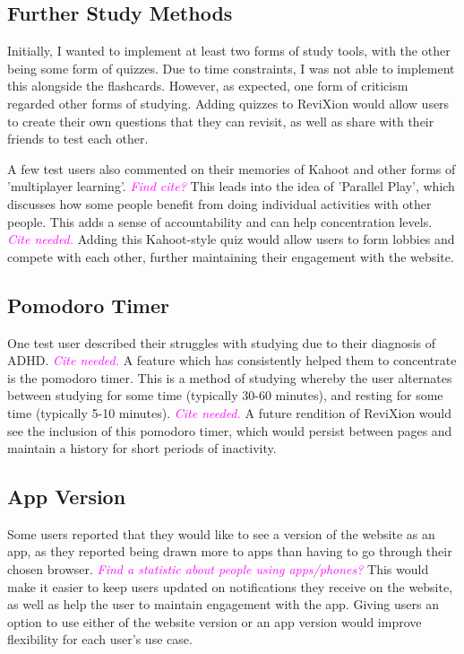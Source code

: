 \documentclass{report}
\begin{document}
\subsection{Further Study Methods}

Initially, I wanted to implement at least two forms of study tools, with the other being some form of quizzes.
Due to time constraints, I was not able to implement this alongside the flashcards.
However, as expected, one form of criticism regarded other forms of studying.
Adding quizzes to ReviXion would allow users to create their own questions that they can revisit,
as well as share with their friends to test each other.

A few test users also commented on their memories of Kahoot
and other forms of 'multiplayer learning'. \textcolor{magenta}{\textit{Find cite?}}
This leads into the idea of 'Parallel Play', which discusses how some people benefit from doing individual activities with other people.
This adds a sense of accountability and can help concentration levels. \textcolor{magenta}{\textit{Cite needed.}}
Adding this Kahoot-style quiz would allow users to form lobbies and compete with each other,
further maintaining their engagement with the website.

\subsection{Pomodoro Timer}

One test user described their struggles with studying due to their diagnosis of ADHD. \textcolor{magenta}{\textit{Cite needed.}}
A feature which has consistently helped them to concentrate is the pomodoro timer.
This is a method of studying whereby the user alternates between studying for some time (typically 30-60 minutes), and resting for some time (typically 5-10 minutes).
\textcolor{magenta}{\textit{Cite needed.}}
A future rendition of ReviXion would see the inclusion of this pomodoro timer,
which would persist between pages and maintain a history for short periods of inactivity.

\subsection{App Version}

Some users reported that they would like to see a version of the website as an app,
as they reported being drawn more to apps than having to go through their chosen browser.
\textcolor{magenta}{\textit{Find a statistic about people using apps/phones?}}
This would make it easier to keep users updated on notifications they receive on the website,
as well as help the user to maintain engagement with the app.
Giving users an option to use either of the website version or an app version would improve flexibility for each user's use case.
\end{document}
